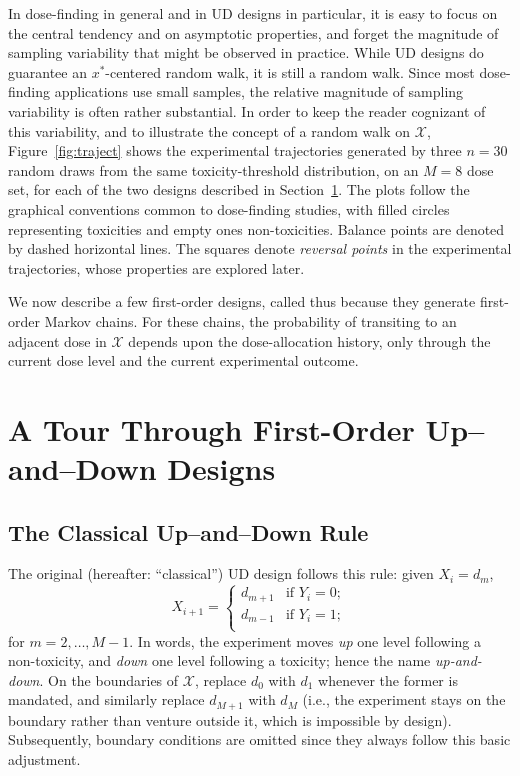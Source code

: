 In dose-finding in general and in UD designs in particular, it is easy to focus on the central tendency and on asymptotic properties, and forget the magnitude of sampling variability that might be observed in practice. While UD designs do guarantee an $x^*$-centered random walk, it is still a random walk. Since most dose-finding applications use small samples, the relative magnitude of sampling variability is often rather substantial. In order to keep the reader cognizant of this variability, and to illustrate the concept of a random walk on $\mathcal{X}$, Figure~\ref{fig:traject} shows the experimental trajectories generated by three $n=30$ random draws from the same toxicity-threshold distribution, on an $M=8$ dose set, for each of the two designs described in Section~\ref{sec:tour}. The plots follow the graphical conventions common to dose-finding studies, with filled circles representing toxicities and empty ones non-toxicities. Balance points are denoted by dashed horizontal lines. The squares denote \emph{reversal points} in the experimental trajectories, whose properties are explored later.

We now describe a few first-order designs, called thus because they generate first-order Markov chains. For these chains, the probability of transiting to an adjacent dose in $\mathcal{X}$ depends upon the dose-allocation history, only through the current dose level and the current experimental outcome.

\chapter{A Tour Through First-Order Up--and--Down Designs}\label{sec:tour}
\section{The Classical Up--and--Down Rule}

The original (hereafter: ``classical'') UD design follows this rule: given $X_i=d_m$,
\begin{equation*}
X_{i+1}=
\begin{cases}
d_{m+1} &\textrm{if $Y_i=0$};\\
d_{m-1} &\textrm{if $Y_i=1$};\\
\end{cases}
\end{equation*}
for $m=2,\ldots,M-1$. In words, the experiment moves \emph{up} one level following a non-toxicity, and \emph{down} one level following a toxicity; hence the name \emph{up-and-down}. On the boundaries of $\mathcal{X}$, replace $d_0$ with $d_1$ whenever the former is mandated, and similarly replace $d_{M+1}$ with $d_M$ (i.e., the experiment stays on the boundary rather than venture outside it, which is impossible by design). Subsequently, boundary conditions are omitted since they always follow this basic adjustment.

